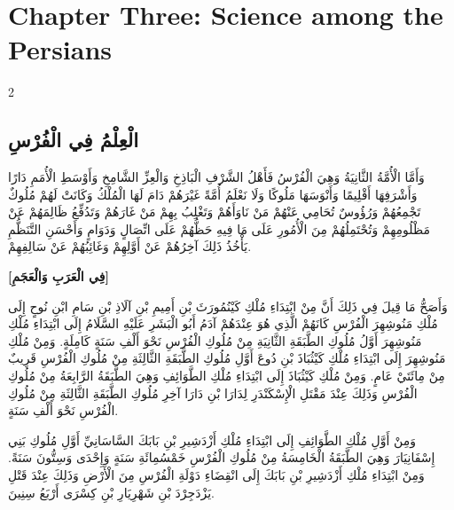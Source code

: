 \documentclass[11pt,a4paper]{article}
\newcommand{\ar}[1]{\arabicfont\beginR #1\endR}
\begin{document}
\section*{Chapter Three: Science among the Persians}

\begin{paracol}{2}
\sloppy

\begin{leftcolumn}
\subsection*{\ar{الْعِلْمُ فِي الْفُرْسِ}}
\vspace{0.3cm}
{\arabicfont\beginR
وَأَمَّا الْأُمَّةُ الثَّانِيَةُ وَهِيَ الْفُرْسُ فَأَهْلُ الشَّرْفِ الْبَاذِخِ وَالْعِزِّ الشَّامِخِ وَأَوْسَطِ الْأُمَمِ دَارًا وَأَشْرَفِهَا أَقْلِيمًا وَأَنْوَسَهَا مَلُوكًا وَلَا نَعْلَمُ أُمَّةً غَيْرَهُمْ دَامَ لَهَا الْمُلْكُ وَكَانَتْ لَهُمْ مُلُوكٌ تَجْمِعُهُمْ وَرُؤُوسٌ تُحَامِي عَنْهُمْ مَنْ نَاوَأَهُمْ وَتَغْلِبُ بِهِمْ مَنْ غَارَهُمْ وَتَدُفِّعُ ظَالِمَهُمْ عَنْ مَظْلُومِهِمْ وَتُحْتَمِلُهُمْ مِنَ الْأُمُورِ عَلَى مَا فِيهِ حَظُّهُمْ عَلَى اتِّصَالٍ وَدَوَامٍ وَأَحْسَنِ التَّنَظُّمِ يَأْخُذُ ذَلِكَ آخِرُهُمْ عَنْ أَوَّلِهِمْ وَغَائِبُهُمْ عَنْ سَالِفِهِمْ.
\endR}

\vspace{0.4cm}
{\arabicfont\beginR
\textbf{[فِي الْعَرَبِ وَالْعَجَمِ]}
\endR}

\vspace{0.3cm}
{\arabicfont\beginR
وَأَصَحُّ مَا قِيلَ فِي ذَلِكَ أَنَّ مِنْ ابْتِدَاءِ مُلْكِ كَيْنُمُورَثَ بْنِ أَمِيمِ بْنِ آلَاذِ بْنِ سَامِ ابْنِ نُوحٍ إِلَى مُلْكِ مَنُوشِهِرَ الْفُرْسِ كَانَهُمْ الَّذِي هُوَ عِنْدَهُمْ آدَمُ أَبُو الْبَشَرِ عَلَيْهِ السَّلَامُ إِلَى ابْتِدَاءِ مُلْكِ مَنُوشِهِرَ أَوَّلُ مُلُوكِ الطَّبَقَةِ الثَّانِيَةِ مِنْ مُلُوكِ الْفُرْسِ نَحْوَ أَلْفِ سَنَةٍ كَامِلَةٍ. وَمِنْ مُلْكِ مَنُوشِهِرَ إِلَى ابْتِدَاءِ مُلْكِ كَيْثُبَاذَ بْنِ دُوعَ أَوَّلِ مُلُوكِ الطَّبَقَةِ الثَّالِثَةِ مِنْ مُلُوكِ الْفُرْسِ قَرِيبٌ مِنْ مِائَتَيْ عَامٍ. وَمِنْ مُلْكِ كَيْثُبَاذَ إِلَى ابْتِدَاءِ مُلْكِ الطَّوَائِفِ وَهِيَ الطَّبَقَةُ الرَّابِعَةُ مِنْ مُلُوكِ الْفُرْسِ وَذَلِكَ عِنْدَ مَقْتَلِ الْإِسْكَنْدَرِ لِدَارَا بْنِ دَارَا آخِرِ مُلُوكِ الطَّبَقَةِ الثَّالِثَةِ مِنْ مُلُوكِ الْفُرْسِ نَحْوَ أَلْفِ سَنَةٍ.
\endR}

\vspace{0.3cm}
{\arabicfont\beginR
وَمِنْ أَوَّلِ مُلْكِ الطَّوَائِفِ إِلَى ابْتِدَاءِ مُلْكِ أَزْدَشِيرِ بْنِ بَابَكَ السَّاسَانِيِّ أَوَّلِ مُلُوكِ بَنِي إِسْفَانِيَارَ وَهِيَ الطَّبَقَةُ الْخَامِسَةُ مِنْ مُلُوكِ الْفُرْسِ خَمْسُمِائَةِ سَنَةٍ وَإِحْدَى وَسِتُّونَ سَنَةً. وَمِنْ ابْتِدَاءِ مُلْكِ أَزْدَشِيرِ بْنِ بَابَكَ إِلَى انْقِضَاءِ دَوْلَةِ الْفُرْسِ مِنَ الْأَرْضِ وَذَلِكَ عِنْدَ قَتْلِ يَزْدَجِرْدَ بْنِ شَهْرِيَارِ بْنِ كِسْرَى أَرْبَعُ سِنِينَ.
\endR}
\end{leftcolumn}


\end{paracol}
\end{document}
